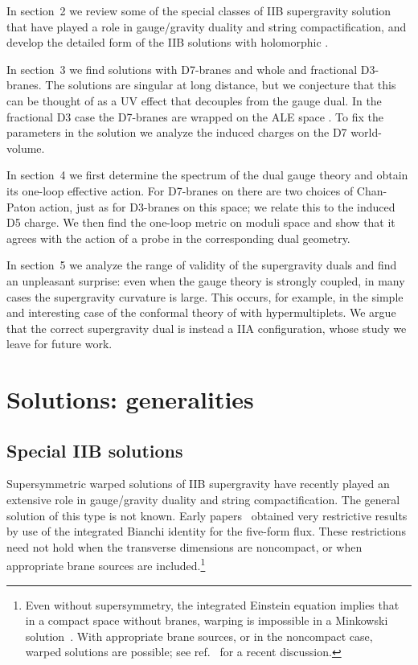\documentclass[a4paper,12pt]{article}
\renewcommand{\=}[1]{\bar{#1}}
\providecommand{\sect}[1]{\section{#1}\setcounter{equation}{0}}
\begin{document}
In section~2 we review some of the special classes of 
IIB supergravity solution that have played a role in gauge/gravity 
duality and string compactification, and
develop the detailed form of the IIB solutions 
with holomorphic \myHighlight{$\tau$}\coordHE{}. 

In section~3 we find solutions with D7-branes and whole and
fractional D3-branes.  The solutions are singular at long distance, 
but we conjecture that this can be thought of as a UV effect that decouples from
the gauge dual.  In the fractional D3 case the D7-branes are wrapped
on the ALE space \coordHE{}.  To fix the parameters in the solution we
analyze the induced charges on the D7 world-volume.

In section~4 we first determine the spectrum of the dual
gauge theory and obtain its one-loop effective action.  For D7-branes on \coordHE{} there are two choices of Chan-Paton action, just as for D3-branes
on this space; we relate this to the induced D5 charge.  We then find the
one-loop metric on moduli space and show that it agrees with the action of a
probe in the corresponding dual geometry.

In section~5 we analyze the range of validity of the supergravity duals and find
an unpleasant surprise: even when the gauge theory is strongly coupled, in many
cases the supergravity curvature is large.  This occurs, for example, in the
simple and interesting case of the conformal theory of \coordHE{} with \coordHE{}
hypermultiplets.  We argue that the correct supergravity dual is instead a IIA
configuration, whose study we leave for future work.


\sect{Solutions: generalities}

\subsection{Special IIB solutions}

Supersymmetric warped solutions of IIB supergravity have recently played an
extensive role in gauge/gravity duality and string compactification.  The
general
solution of this type is not known.  Early papers~\cite{early} obtained very
restrictive results by use of the integrated Bianchi identity for the five-form
flux.  These restrictions need not hold when the transverse dimensions are
noncompact, or when appropriate brane sources are included.\footnote
{Even without supersymmetry, the integrated Einstein equation implies that in a
compact space without branes, warping is impossible in a Minkowski
solution~\cite{hari,MN}.  With appropriate brane sources, or in the
noncompact case, warped solutions are possible; see ref.~\cite{us} for a recent
discussion.}
\end{document}
